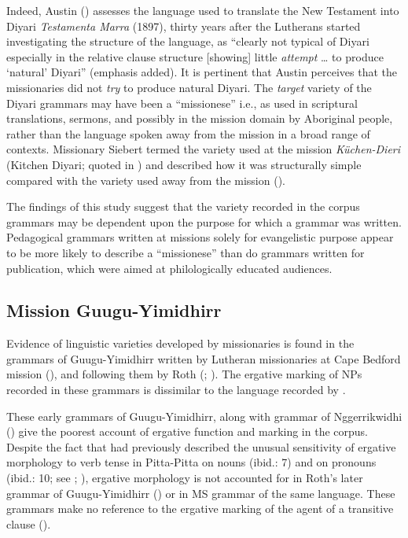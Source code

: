 Indeed, Austin (\citeyear[246--247]{austin_grammar_2013}) assesses the language used to translate the New Testament into Diyari \textit{Testamenta Marra} (1897), thirty years after the Lutherans started investigating the structure of the language, as “clearly not typical of Diyari especially in the relative clause structure [showing] little \textit{attempt} … to produce `natural' Diyari'' (emphasis added). It is pertinent that Austin perceives that the missionaries did not \textit{try} to produce natural Diyari. The \textit{target} variety of the Diyari grammars may have been a “missionese” i.e., as used in scriptural translations, sermons, and possibly in the mission domain by Aboriginal people, rather than the language spoken away from the mission in a broad range of contexts. Missionary Siebert termed the variety used at the mission \textit{Küchen-Dieri} (Kitchen Diyari; quoted in \citealt[372--373]{kneebone_language_2005}) and described how it was structurally simple compared with the variety used away from the mission ().

The findings of this study suggest that the variety recorded in the corpus grammars may be dependent upon the purpose for which a grammar was written. Pedagogical grammars written at missions solely for evangelistic purpose appear to be more likely to describe a “missionese” than do grammars written for publication, which were aimed at philologically educated audiences. 

\subsection{Mission Guugu-Yimidhirr}
\label{sec:key:2.5.1}

Evidence of linguistic varieties developed by missionaries is found in the grammars of Guugu-Yimidhirr written by Lutheran missionaries at Cape Bedford mission (\citealt{schwarz_koko_1900}), and following them by Roth (\citeyear{roth_structure_1901}; ). The ergative marking of NPs recorded in these grammars is dissimilar to the language recorded by \citet{haviland_guugu_1979}.

These early grammars of Guugu-Yimidhirr, along with  grammar of Nggerrikwidhi () give the poorest account of ergative function and marking in the corpus. Despite the fact that \citet{roth_ethnological_1897} had previously described the unusual sensitivity of ergative morphology to verb tense in Pitta-Pitta on nouns (ibid.: 7) and on pronouns (ibid.: 10; see \citealt[84--90]{blake_pitta-pitta_1971}; ), ergative morphology is not accounted for in Roth’s later grammar of Guugu-Yimidhirr () or in  MS grammar of the same language. These grammars make no reference to the ergative marking of the agent of a transitive clause ().

